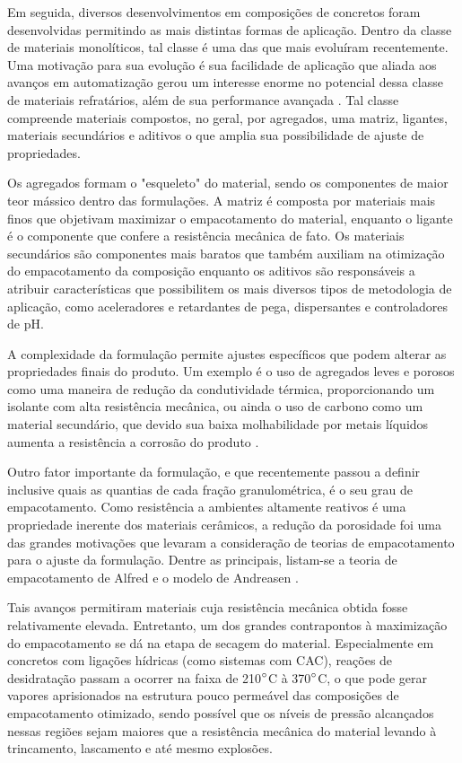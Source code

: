     Em seguida, diversos desenvolvimentos em composições de concretos foram desenvolvidas permitindo as mais distintas formas de aplicação.    Dentro da classe de materiais monolíticos, tal classe é uma das que mais evoluíram recentemente. Uma motivação para sua evolução é sua facilidade de aplicação que aliada aos avanços em automatização gerou um interesse enorme no potencial dessa classe de materiais refratários, além de sua performance avançada \cite{Schacht2004}. Tal classe compreende materiais compostos, no geral, por agregados, uma matriz, ligantes, materiais secundários e aditivos o que amplia sua possibilidade de ajuste de propriedades.
    
    Os agregados formam o "esqueleto" do material, sendo os componentes de maior teor mássico dentro das formulações. A matriz é composta por materiais mais finos que objetivam maximizar o empacotamento do material, enquanto o ligante é o componente que confere a resistência mecânica de fato. Os materiais secundários são componentes mais baratos que também auxiliam na otimização do empacotamento da composição enquanto os aditivos são responsáveis a atribuir características que possibilitem os mais diversos tipos de metodologia de aplicação, como aceleradores e retardantes de pega, dispersantes e controladores de pH.
    
    A complexidade da formulação permite ajustes específicos que podem alterar as propriedades finais do produto. Um exemplo é o uso de agregados leves e porosos como uma maneira de redução da condutividade térmica, proporcionando um isolante com alta resistência mecânica, ou ainda o uso de carbono como um material secundário, que devido sua baixa molhabilidade por metais líquidos aumenta a resistência a corrosão do produto \cite{Schacht2004}.
    
    Outro fator importante da formulação, e que recentemente passou a definir inclusive quais as quantias de cada fração granulométrica, é o seu grau de empacotamento. Como resistência a ambientes altamente reativos é uma propriedade inerente dos materiais cerâmicos, a redução da porosidade foi uma das grandes motivações que levaram a consideração de teorias de empacotamento para o ajuste da formulação. Dentre as principais, listam-se a teoria de empacotamento de Alfred e o modelo de Andreasen \cite{Ortega1997}. 
    
    Tais avanços permitiram materiais cuja resistência mecânica obtida fosse relativamente elevada. Entretanto, um dos grandes contrapontos à maximização do empacotamento se dá na etapa de secagem do material. Especialmente em concretos com ligações hídricas (como sistemas com CAC), reações de desidratação passam a ocorrer na faixa de 210$\degree$C à 370$\degree$C, o que pode gerar vapores aprisionados na estrutura pouco permeável das composições de empacotamento otimizado, sendo possível que os níveis de pressão alcançados nessas regiões sejam maiores que a resistência mecânica do material levando à trincamento, lascamento e até mesmo explosões.
